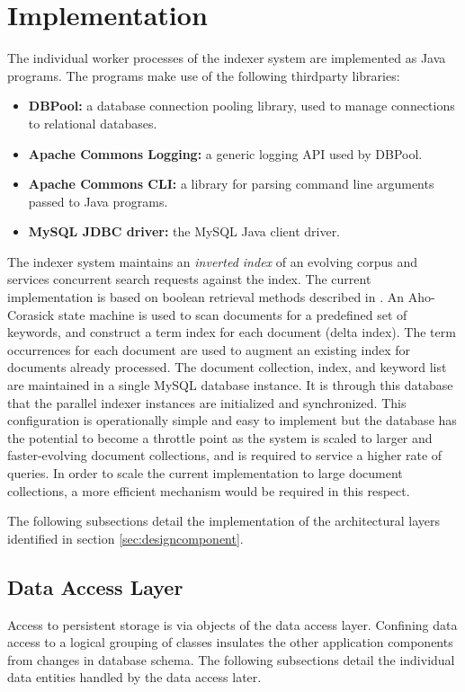 \documentclass[10pt]{report}
\begin{document}
\section{Implementation}
\label{sec:implementation}
The individual worker processes of the indexer system are implemented as Java
programs. The programs make use of the following thirdparty libraries:

\begin{itemize}
  \item \textbf{DBPool:} a database connection pooling library, used
    to manage connections to relational databases.
  \item \textbf{Apache Commons Logging:} a generic logging API used by
    DBPool.
  \item \textbf{Apache Commons CLI:} a library for parsing command
    line arguments passed to Java programs.
  \item \textbf{MySQL JDBC driver:} the MySQL Java client driver.
\end{itemize}


The indexer system maintains an \textit{inverted index} of an evolving
corpus and services concurrent search requests against the index. The
current implementation is based on boolean retrieval methods described
in \cite{RefWorks:109}. An Aho-Corasick state machine
\cite{RefWorks:103} is used to scan documents for a predefined set of
keywords, and construct a term index for each document (delta
index). The term occurrences for each document are used to augment an
existing index for documents already processed. The document
collection, index, and keyword list are maintained in a single MySQL
database instance. It is through this database that the parallel
indexer instances are initialized and synchronized. This configuration
is operationally simple and easy to implement but the database has the
potential to become a throttle point as the system is scaled to larger
and faster-evolving document collections, and is required to service a
higher rate of queries. In order to scale the current implementation
to large document collections, a more efficient mechanism would be
required in this respect.

The following subsections detail the implementation of the
architectural layers identified in section \ref{sec:designcomponent}.

\subsection{Data Access Layer}
\label{sec:dataaccesslayer}
Access to persistent storage is via objects of the data access
layer. Confining data access to a logical grouping of classes
insulates the other application components from changes in database
schema. The following subsections detail the individual data entities
handled by the data access later.
\end{document}
